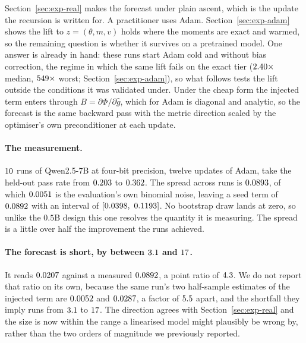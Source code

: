 Section~\ref{sec:exp-real} makes the forecast under plain ascent, which is the update the
recursion is written for. A practitioner uses Adam. Section~\ref{sec:exp-adam} shows the lift to
$z = (\theta, m, v)$ holds where the moments are exact and warmed, so the remaining question is
whether it survives on a pretrained model. One answer is already in hand: these runs start Adam
cold and without bias correction, the regime in which the same lift fails on the exact tier
($2.40\times$ median, $549\times$ worst;
Section~\ref{sec:exp-adam}), so what follows tests the lift outside the conditions it was
validated under. Under the cheap form the injected
term enters through $B = \partial\Phi/\partial\hat{g}$, which for Adam is diagonal and analytic,
so the forecast is the same backward pass with the metric direction scaled by the optimiser's own
preconditioner at each update.

\paragraph{The measurement.} $10$ runs of Qwen2.5-7B at four-bit precision, twelve
updates of Adam, take the held-out pass rate from $0.203$ to $0.362$. The
spread across runs is $0.0893$, of which $0.0051$ is the evaluation's
own binomial noise, leaving a seed term of $0.0892$ with an interval of
$[\numAdamScaleResolvedLow,\ \numAdamScaleResolvedHigh]$. No bootstrap draw lands at zero, so
unlike the $0.5$B design this one resolves the quantity it is measuring. The spread is a little
over half the improvement the runs achieved.

\paragraph{The forecast is short, by between $3.1$ and
$17$.} It reads $0.0207$ against a measured
$0.0892$, a point ratio of $4.3$. We do not report that ratio on
its own, because the same run's two half-sample estimates of the injected term are
$0.0052$ and $0.0287$, a factor of $5.5$ apart, and
the shortfall they imply runs from $3.1$ to $17$. The
direction agrees with Section~\ref{sec:exp-real} and the size is now within the range a linearised
model might plausibly be wrong by, rather than the two orders of magnitude we previously reported.

